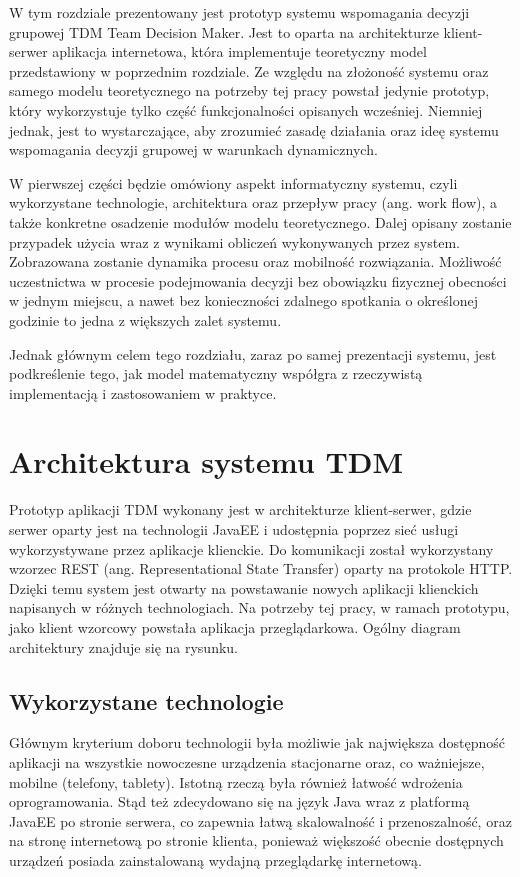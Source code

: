 W tym rozdziale prezentowany jest prototyp systemu wspomagania decyzji grupowej
TDM Team Decision Maker. Jest to oparta na architekturze klient-serwer
aplikacja internetowa, która implementuje teoretyczny model przedstawiony w
poprzednim rozdziale. Ze względu na złożoność systemu oraz samego modelu
teoretycznego na potrzeby tej pracy powstał jedynie prototyp, który wykorzystuje
tylko część funkcjonalności opisanych wcześniej. Niemniej jednak, jest to
wystarczające, aby zrozumieć zasadę działania oraz ideę systemu wspomagania
decyzji grupowej w warunkach dynamicznych.

W pierwszej części będzie omówiony aspekt informatyczny systemu,
czyli wykorzystane technologie, architektura oraz przepływ pracy (ang. work
flow), a także konkretne osadzenie modułów modelu teoretycznego.
Dalej opisany zostanie przypadek użycia wraz z wynikami obliczeń
wykonywanych przez system. Zobrazowana zostanie dynamika procesu oraz mobilność
rozwiązania. Możliwość uczestnictwa w procesie podejmowania decyzji bez
obowiązku fizycznej obecności w jednym miejscu, a nawet bez konieczności
zdalnego spotkania o określonej godzinie to jedna z większych zalet systemu.

Jednak głównym celem tego rozdziału, zaraz po samej prezentacji systemu, jest
podkreślenie tego, jak model matematyczny współgra z rzeczywistą implementacją i
zastosowaniem w praktyce. 

\section{Architektura systemu TDM}
Prototyp aplikacji TDM wykonany jest w architekturze klient-serwer, gdzie serwer
oparty jest na technologii JavaEE i udostępnia poprzez sieć usługi
wykorzystywane przez aplikacje klienckie. Do komunikacji został wykorzystany
wzorzec REST (ang. Representational State Transfer) oparty na protokole HTTP.
Dzięki temu system jest otwarty na powstawanie nowych aplikacji klienckich
napisanych w różnych technologiach. Na potrzeby tej pracy, w ramach prototypu,
jako klient wzorcowy powstała aplikacja przeglądarkowa. Ogólny diagram
architektury znajduje się na rysunku.

\subsection{Wykorzystane technologie}
Głównym kryterium doboru technologii była możliwie jak największa dostępność
aplikacji na wszystkie nowoczesne urządzenia stacjonarne oraz, co ważniejsze,
mobilne (telefony, tablety). Istotną rzeczą była również łatwość wdrożenia
oprogramowania. Stąd też zdecydowano się na język Java wraz z platformą JavaEE
po stronie serwera, co zapewnia łatwą skalowalność i przenoszalność, oraz
na stronę internetową po stronie klienta, ponieważ większość obecnie dostępnych
urządzeń posiada zainstalowaną wydajną przeglądarkę internetową.

